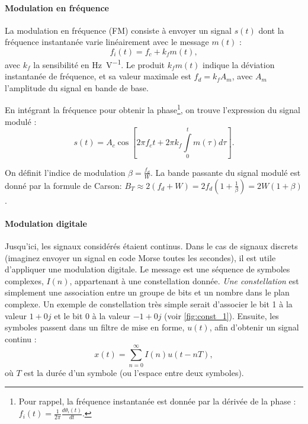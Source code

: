 \documentclass [a4paper, 11pt] {article}
\begin{document}
    \paragraph{Modulation en fréquence} La modulation en fréquence (FM) consiste à envoyer un signal $s(t)$ dont la fréquence instantanée varie linéairement avec le message $m(t)$ :
    \begin{equation}
        f_i(t) = f_c + k_f m(t),
    \end{equation}
    avec $k_f$ la sensibilité en \si{\hertz\per\volt}. Le produit $k_f m(t)$ indique la déviation instantanée de fréquence, et sa valeur maximale est $f_d=k_f A_m$, avec $A_m$ l'amplitude du signal en bande de base.
    
    En intégrant la fréquence pour obtenir la phase\footnote{Pour rappel, la fréquence instantanée est donnée par la dérivée de la phase : $f_i(t) = \frac{1}{2\pi}\frac{d\theta_i (t)}{dt}$.}, on trouve l'expression du signal modulé :
    \begin{equation}
        s(t) = A_c \cos \left[2\pi f_c t + 2\pi k_f \int\limits_0^t m(\tau)d\tau \right].
    \end{equation}
    
    On définit l'indice de modulation $\beta=\frac{f_d}{W}$. La bande passante du signal modulé est donné par la formule de Carson:  $B_T \approx 2\left(f_d + W\right) = 2f_d \left(1 + \frac{1}{\beta}\right)=2W(1+\beta)$.
    
    \pagestyle{nextpages}
    
    \paragraph{Modulation digitale} Jusqu'ici, les signaux considérés étaient continus. Dans le cas de signaux discrets (imaginez envoyer un signal en code Morse toutes les secondes), il est utile d'appliquer une modulation digitale. Le message est une séquence de symboles complexes, $I(n)$, appartenant à une constellation donnée. \textit{Une constellation} est simplement une association entre un groupe de bits et un nombre dans le plan complexe. Un exemple de constellation très simple serait d'associer le bit 1 à la valeur $1+0j$ et le bit 0 à la valeur $-1+0j$ (voir \autoref{fig:const_1}). Ensuite, les symboles passent dans un filtre de mise en forme, $u(t)$, afin d'obtenir un signal continu :
    \begin{equation}
        x(t) = \sum\limits_{n=0}^{\infty}I(n) u(t-nT),
    \end{equation}
    où $T$ est la durée d'un symbole (ou l'espace entre deux symboles).
    
\end{document}
